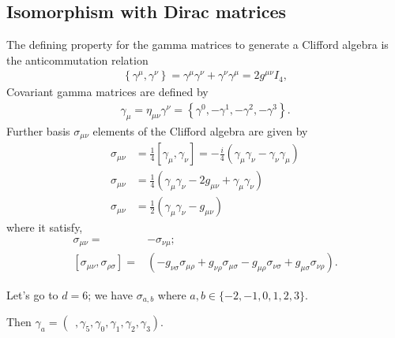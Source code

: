 \documentclass[]{article}
\numberwithin{equation}{section}
\begin{document}
{{\subsection{Isomorphism with Dirac matrices}
The defining property for the gamma matrices to generate a Clifford algebra is the anticommutation relation 
\begin{align}
    \left\{\gamma ^{\mu },\gamma ^{\nu }\right\}=\gamma ^{\mu }\gamma ^{\nu }+\gamma ^{\nu }\gamma ^{\mu }=2g ^{\mu \nu }I_{4},
\end{align}
Covariant gamma matrices are defined by
\begin{align}
    {\gamma _{\mu }=\eta _{\mu \nu }\gamma ^{\nu }=\left\{\gamma ^{0},-\gamma ^{1},-\gamma ^{2},-\gamma ^{3}\right\}.}
\end{align}
Further basis $\sigma _{\mu \nu }$ elements of the Clifford algebra are given by
\begin{align}
    \sigma _{\mu \nu }&={\frac {1}{4}}[\gamma _{\mu },\gamma _{\nu }]=-{\frac {i}{4}}(\gamma _{\mu }\gamma _{\nu }-\gamma _{\nu }\gamma _{\mu })\\
    \sigma _{\mu \nu }&={\frac {1}{4}}\left(\gamma _{\mu }\gamma _{\nu }-2g_{\mu\nu}+\gamma _{\mu }\gamma _{\nu }\right)\\
    \sigma _{\mu \nu }&={\frac {1}{2}}(\gamma _{\mu }\gamma _{\nu }-g_{\mu\nu})
\end{align}
where it satisfy,
\begin{align}
   \sigma_{\mu\nu}=&-\sigma_{\nu\mu};\\
   \left[\sigma _{\mu \nu },\sigma _{\rho \sigma }\right]=&\left(-g_{{\nu}{\sigma}}\sigma_{{\mu}{\rho}}+g_{{\nu}{\rho}}\sigma_{{\mu}{\sigma}}-g_{{\mu}{\rho}}\sigma_{{\nu}{\sigma}}+g_{{\mu}{\sigma}}\sigma_{{\nu}{\rho}}\right).
\end{align}

Let's go to $d=6$; we have $\sigma_{a,b}$ where $a,b\in\{-2,-1,0,1,2,3\}$.

Then $\gamma_a=(~~,\gamma_5,\gamma_0,\gamma_1,\gamma_2,\gamma_3)$.

}}
\end{document}
